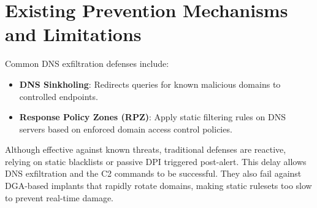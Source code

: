 \documentclass [11pt, proquest] {uwthesis}[2020/02/24]
\begin{document}
\section{Existing Prevention Mechanisms and Limitations}
Common DNS exfiltration defenses include:
    \begin{itemize}[nosep]
        \item \textbf{DNS Sinkholing}: Redirects queries for known malicious domains to controlled endpoints.
        \item \textbf{Response Policy Zones (RPZ)}: Apply static filtering rules on DNS servers based on enforced domain access control policies.
    \end{itemize}
Although effective against known threats, traditional defenses are reactive, relying on static blacklists or passive DPI triggered post-alert. This delay allows DNS exfiltration and the C2 commands to be successful. They also fail against DGA-based implants that rapidly rotate domains, making static rulesets too slow to prevent real-time damage.
\end{document}
